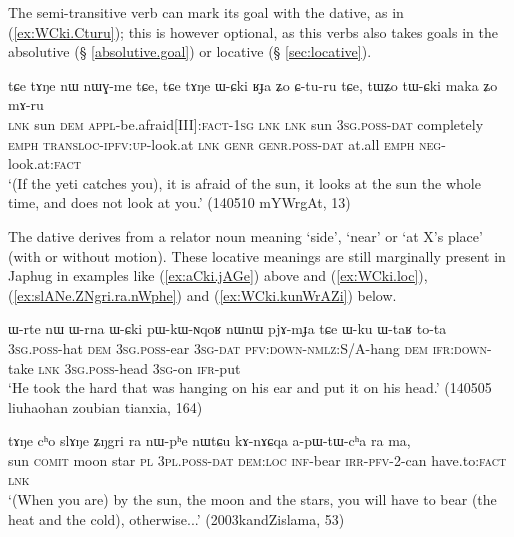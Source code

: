  
The semi-transitive verb  can mark its goal with the dative, as in (\ref{ex:WCki.Cturu}); this is however optional, as this verbs also takes goals in the absolutive (§ \ref{absolutive.goal}) or locative (§ \ref{sec:locative}).

\begin{exe}
\ex \label{ex:WCki.Cturu}
\gll tɕe tɤŋe nɯ nɯɣ-me tɕe, tɕe tɤŋe ɯ-ɕki ʁɟa ʑo ɕ-tu-ru tɕe, tɯʑo tɯ-ɕki maka ʑo mɤ-ru \\
\textsc{lnk} sun \textsc{dem} \textsc{appl}-be.afraid[III]:\textsc{fact}-\textsc{1sg} \textsc{lnk} \textsc{lnk} sun \textsc{3sg}.\textsc{poss}-\textsc{dat} completely \textsc{emph} \textsc{transloc}-\textsc{ipfv}:\textsc{up}-look.at \textsc{lnk} \textsc{genr} \textsc{genr}.\textsc{poss}-\textsc{dat} at.all \textsc{emph} \textsc{neg}-look.at:\textsc{fact} \\
\glt `(If the yeti catches you), it is afraid of the sun, it looks at the sun the whole time, and does not look at you.' (140510 mYWrgAt, 13)
\end{exe}

The dative  derives from a relator noun meaning `side', `near' or `at X's place' (with or without motion). These locative meanings are still marginally present in Japhug in examples like (\ref{ex:aCki.jAGe}) above and (\ref{ex:WCki.loc}), (\ref{ex:slANe.ZNgri.ra.nWphe}) and (\ref{ex:WCki.kunWrAZi}) below.

\begin{exe}
\ex \label{ex:WCki.loc}
\gll  ɯ-rte nɯ ɯ-rna ɯ-ɕki pɯ-kɯ-ɴqoʁ nɯnɯ pjɤ-mɟa tɕe ɯ-ku ɯ-taʁ to-ta \\
\textsc{3sg.poss}-hat \textsc{dem} \textsc{3sg.poss}-ear \textsc{3sg}-\textsc{dat} \textsc{pfv:down-nmlz}:S/A-hang \textsc{dem} \textsc{ifr:down}-take \textsc{lnk} \textsc{3sg.poss}-head \textsc{3sg}-on \textsc{ifr}-put \\
\glt `He took the hard that was hanging on his ear and put it on his head.' (140505 liuhaohan zoubian tianxia, 164)
\end{exe}

\begin{exe}
\ex \label{ex:slANe.ZNgri.ra.nWphe}
\gll   tɤŋe cʰo slɤŋe ʑŋgri ra nɯ-pʰe nɯtɕu kɤ-nɤɕqa a-pɯ-tɯ-cʰa ra ma, \\
sun \textsc{comit} moon star \textsc{pl} \textsc{3pl}.\textsc{poss}-\textsc{dat} \textsc{dem}:\textsc{loc} \textsc{inf}-bear \textsc{irr}-\textsc{pfv}-2-can have.to:\textsc{fact} \textsc{lnk} \\
\glt `(When you are) by the sun, the moon and the stars, you will have to bear (the heat and the cold), otherwise...' (2003kandZislama, 53)
\end{exe}
 
